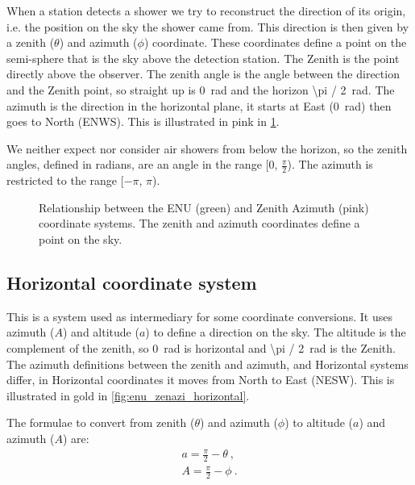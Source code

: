 When a station detects a shower we try to reconstruct the direction of
its origin, i.e. the position on the sky the shower came from. This
direction is then given by a zenith ($\theta$) and azimuth ($\phi$)
coordinate. These coordinates define a point on the semi-sphere that is
the sky above the detection station. The Zenith is the point directly
above the observer. The zenith angle is the angle between the direction
and the Zenith point, so straight up is \SI{0}{\radian} and the horizon
\SI{\pi / 2}{\radian}. The azimuth is the direction in the horizontal
plane, it starts at East (\SI{0}{\radian}) then goes to North (ENWS).
This is illustrated in pink in \cref{fig:enu_zenazi}.

We neither expect nor consider air showers from below the horizon, so the
zenith angles, defined in radians, are an angle in the range [0,
$\frac{\pi}{2}$). The azimuth is restricted to the range [$-\pi$, $\pi$).

\begin{figure}
    \centering
    
    \caption{Relationship between the ENU (green) and Zenith Azimuth (pink)
             coordinate systems. The zenith and azimuth coordinates define
             a point on the sky.}
    \label{fig:enu_zenazi}
\end{figure}


\subsection{Horizontal coordinate system}

This is a system used as intermediary for some coordinate conversions.
It uses azimuth ($A$) and altitude ($a$) to define a direction on the sky. The
altitude is the complement of the zenith, so \SI{0}{\radian} is horizontal
and \SI{\pi / 2}{\radian} is the Zenith. The azimuth definitions between the
zenith and azimuth, and Horizontal systems differ, in Horizontal
coordinates it moves from North to East (NESW). This is illustrated in
gold in \cref{fig:enu_zenazi_horizontal}.

The formulae to convert from zenith ($\theta$) and azimuth ($\phi$) to
altitude ($a$) and azimuth ($A$) are:
%
\begin{equation}
    \begin{array}{l}
        a = \frac{\pi}{2} - \theta \ , \\
        A = \frac{\pi}{2} - \phi \ .
    \end{array}
\end{equation}

